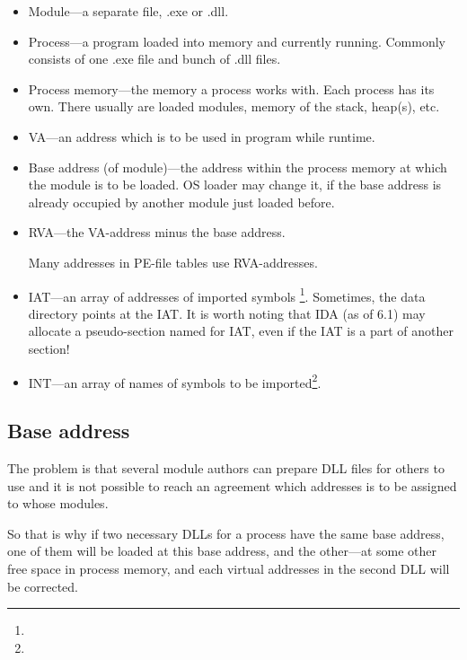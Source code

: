 \begin{itemize}
\item Module---a separate file, .exe or .dll.

\item Process---a program loaded into memory and currently running.  Commonly consists of one .exe file and bunch of .dll files.

\item Process memory---the memory a process works with.  Each process has its own.
There usually are loaded modules, memory of the stack, \gls{heap}(s), etc.

\item \ac{VA}---an address which is to be used in program while runtime.

\item Base address (of module)---the address within the process memory at which the module is to be loaded.
\ac{OS} loader may change it, if the base address is already occupied by another module just loaded before.

\item \ac{RVA}---the \ac{VA}-address minus the base address.

Many addresses in PE-file tables use \ac{RVA}-addresses.


\item \ac{IAT}---an array of addresses of imported symbols \footnote{\PietrekPE}. 
Sometimes, the  data directory points at the \ac{IAT}. 
\label{IDA_idata}
It is worth noting that \ac{IDA} (as of 6.1) may allocate a pseudo-section named  for
\ac{IAT}, even if the \ac{IAT} is a part of another section!

\item \ac{INT}---an array of names of symbols to be imported\footnote{\PietrekPE}.
\end{itemize}

\subsection{Base address}

The problem is that several module authors can prepare DLL files for others to use and it is not possible
to reach an agreement which addresses is to be assigned to whose modules.

So that is why if two necessary DLLs for a process have the same base address,
one of them will be loaded at this base address, and the other---at some other free space in process memory,
and each virtual addresses in the second DLL will be corrected.

